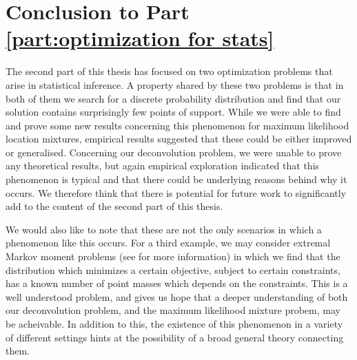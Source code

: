 \chapter{Conclusion to Part \ref{part:optimization for stats}}
\label{Ch:StatisticalOptimizationConclusion}


\graphicspath{{Figures/Mixtures/}}


The second part of this thesis has focused on two optimization problems that arise in statistical inference. A property shared by these two problems is that in both of them we search for a discrete probability distribution and find that our solution contains surprisingly few points of support. While we were able to find and prove some new results concerning this phenomenon for maximum likelihood location mixtures, empirical results suggested that these could be either improved or generalised. Concerning our deconvolution problem, we were unable to prove any theoretical results, but again empirical exploration indicated that this phenomenon is typical and that there could be underlying reasons behind why it occurs. We therefore think that there is potential for future work to significantly add to the content of the second part of this thesis. 

We would also like to note that these are not the only scenarios in which a phenomenon like this occurs. For a third example, we may consider extremal Markov moment problems (see \cite{Krein1977-ak} for more information) in which we find that the distribution which minimizes a certain objective, subject to certain constraints, has a known number of point masses which depends on the constraints. This is a well understood problem, and gives us hope that a deeper understanding of both our deconvolution problem, and the maximum likelihood mixture probem, may be acheivable. In addition to this, the existence of this phenomenon in a variety of different settings hints at the possibility of a broad general theory connecting them.

